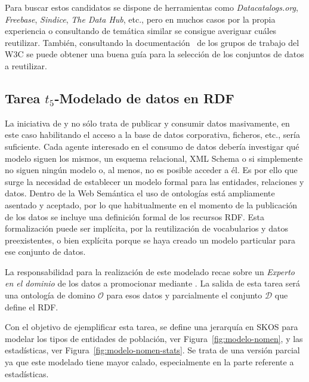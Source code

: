 Para buscar estos \datasets candidatos se dispone de herramientas como \textit{Datacatalogs.org}, \textit{Freebase}, \textit{Sindice}, 
\textit{The Data Hub}, etc., pero en muchos casos por la propia experiencia o consultando \datasets de temática 
similar se consigue averiguar cuáles reutilizar. También, consultando la documentación~\cite{dcat-w3c} de los grupos de trabajo del \gls{W3C} 
se puede obtener una buena guía para la selección de los conjuntos de datos a reutilizar.

\subsection{Tarea $t_5$-Modelado de datos en RDF}
La iniciativa de \linkeddata y \lod no sólo trata de publicar y consumir datos masivamente, en este caso habilitando 
el acceso a la base de datos corporativa, ficheros, etc., sería suficiente. Cada agente interesado en el consumo de datos 
debería investigar qué modelo siguen los mismos, un esquema relacional, \gls{XML Schema} o si simplemente
no siguen ningún modelo o, al menos, no es posible acceder a él. Es por ello que surge la necesidad
de establecer un modelo formal para las entidades, relaciones y datos. Dentro de la Web Semántica el uso
de ontologías está ampliamente asentado y aceptado, por lo que habitualmente en el momento de la publicación de los datos
se incluye una definición formal de los recursos \gls{RDF}. Esta formalización puede
ser implícita, por la reutilización de vocabularios y datos preexistentes, o bien explícita porque se haya creado un modelo particular 
para ese conjunto de datos.

La responsabilidad para la realización de este modelado recae sobre un \textit{Experto en el dominio} de los datos a promocionar
mediante \linkeddata. La salida de esta tarea será una ontología de domino $\mathcal{O}$ para esos datos y 
parcialmente el conjunto $\mathcal{D}$ que define el \dataset RDF.

Con el objetivo de ejemplificar esta tarea, se define una jerarquía en \gls{SKOS} para modelar
los tipos de entidades de población, ver Figura~\ref{fig:modelo-nomen}, y las estadísticas, ver Figura~\ref{fig:modelo-nomen-stats}. Se
trata de una versión parcial ya que este modelado tiene mayor calado, especialmente en la parte referente a estadísticas.


